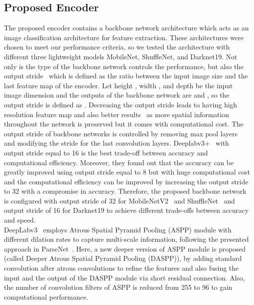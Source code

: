 \documentclass[conference,a4paper]{IEEEtran}
\begin{document}
\subsection{Proposed Encoder}
\label{sec:5}
The proposed encoder contains a backbone network architecture which acts as an image classification architecture for feature extraction. These architectures were chosen to meet our performance criteria, so we tested the architecture with different three lightweight models MobileNet, ShuffleNet, and Darknet19. Not only is the type of the backbone network controls the performance, but also the output stride~\cite{deeplabv3} which is defined as the ratio between the input image size and the last feature map of the encoder. Let height , width , and depth  be the input image dimension and the outputs of the backbone network are  and , so the output stride is defined as . Decreasing the output stride leads to having high resolution feature map and also better results~\cite{deeplabv3} as  more spatial information throughout the network is preserved but it comes with computational cost. The output stride of backbone networks is controlled by removing max pool layers and modifying the stride for the last convolution layers. Deeplabv3+~\cite{deeplabv3plus} with output stride equal to 16 is the best trade-off between accuracy and computational efficiency. Moreover, they found out that the accuracy can be greatly improved using output stride equal to 8 but with huge computational cost and the computational efficiency can be improved by increasing the output stride to 32 with a compromise in accuracy. Therefore, the proposed backbone network is configured with output stride of 32 for MobileNetV2~\cite{mobilenetv2} and ShuffleNet~\cite{shufflenet} and output stride of 16 for Darknet19 to achieve different trade-offs between accuracy and speed. \\
DeepLabv3~\cite{deeplabv3} employs Atrous Spatial Pyramid Pooling (ASPP) module with different dilation rates to capture multi-scale information, following the presented approach in ParseNet~\cite{parsenet}. Here, a new deeper version of ASPP module is proposed (called Deeper Atrous Spatial Pyramid Pooling (DASPP)), by adding standard  convolution after  atrous convolutions to refine the features and also fusing the input and the output of the DASPP module via short residual connection. Also, the number of convolution filters of ASPP is reduced from 255 to 96 to gain computational performance.
\end{document}
